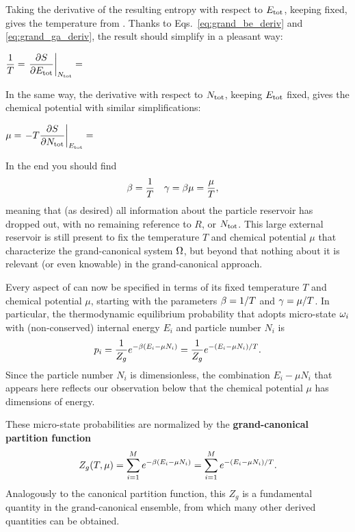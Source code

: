 \newpage %
Taking the derivative of the resulting entropy with respect to $E_{\text{tot}}$, keeping \Ntot fixed, gives the temperature from .
Thanks to Eqs.~\ref{eq:grand_be_deriv} and \ref{eq:grand_ga_deriv}, the result should simplify in a pleasant way:
\begin{mdframed}
  $\displaystyle \frac{1}{T} = \left. \frac{\partial S}{\partial E_{\text{tot}}}\right|_{N_{\text{tot}}} = $ \\[100 pt]
\end{mdframed}
In the same way, the derivative with respect to $N_{\text{tot}}$, keeping $E_{\text{tot}}$ fixed, gives the chemical potential with similar simplifications:
\begin{mdframed}
  $\displaystyle \mu = \left. -T \frac{\partial S}{\partial N_{\text{tot}}}\right|_{E_{\text{tot}}} = $ \\[100 pt]
\end{mdframed}
In the end you should find
\begin{align}
  \beta & = \frac{1}{T} &
  \gamma & = \beta \mu = \frac{\mu}{T},
\end{align}
meaning that (as desired) all information about the particle reservoir has dropped out, with no remaining reference to $R$, \Etot or $N_{\text{tot}}$.
This large external reservoir is still present to fix the temperature $T$ and chemical potential $\mu$ that characterize the grand-canonical system $\Omega$, but beyond that nothing about it is relevant (or even knowable) in the grand-canonical approach.

Every aspect of \Om can now be specified in terms of its fixed temperature $T$ and chemical potential $\mu$, starting with the parameters $\beta = 1 / T$ and $\gamma = \mu / T$.
In particular, the thermodynamic equilibrium probability that \Om adopts micro-state $\omega_i$ with (non-conserved) internal energy $E_i$ and particle number $N_i$ is
\begin{equation}
  \label{eq:grand_prob}
  p_i = \frac{1}{Z_g} e^{-\beta (E_i - \mu N_i)} = \frac{1}{Z_g} e^{-(E_i - \mu N_i) / T}.
\end{equation}
Since the particle number $N_i$ is dimensionless, the combination $E_i - \mu N_i$ that appears here reflects our observation below  that the chemical potential $\mu$ has dimensions of energy.

\begin{shaded}
  These micro-state probabilities are normalized by the \textbf{grand-canonical partition function}
  \begin{equation}
    \label{eq:grand_part_func}
    Z_g(T, \mu) = \sum_{i = 1}^M e^{-\beta (E_i - \mu N_i)} = \sum_{i = 1}^M e^{-(E_i - \mu N_i) / T}.
  \end{equation}
  Analogously to the canonical partition function, this $Z_g$ is a fundamental quantity in the grand-canonical ensemble, from which many other derived quantities can be obtained.
\end{shaded}



